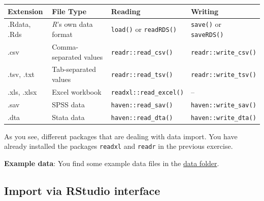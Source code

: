 \documentclass[
]{scrartcl}
\begin{document}
\begin{longtable}[]{@{}
  >{\raggedright\arraybackslash}p{}
  >{\raggedright\arraybackslash}p{}
  >{\raggedright\arraybackslash}p{}
  >{\raggedright\arraybackslash}p{}@{}}
\toprule\noalign{}
\begin{minipage}[b]{\linewidth}\raggedright
Extension
\end{minipage} & \begin{minipage}[b]{\linewidth}\raggedright
File Type
\end{minipage} & \begin{minipage}[b]{\linewidth}\raggedright
Reading
\end{minipage} & \begin{minipage}[b]{\linewidth}\raggedright
Writing
\end{minipage} \\
\midrule\noalign{}
\endhead
\bottomrule\noalign{}
\endlastfoot
.Rdata, .Rds & \emph{R}'s own data format & \texttt{load()} or \texttt{readRDS()} & \texttt{save()} or \texttt{saveRDS()} \\
.csv & Comma-separated values & \texttt{readr::read\_csv()} & \texttt{readr::write\_csv()} \\
.tsv, .txt & Tab-separated values & \texttt{readr::read\_tsv()} & \texttt{readr::write\_tsv()} \\
.xls, .xlsx & Excel workbook & \texttt{readxl::read\_excel()} & -- \\
.sav & SPSS data & \texttt{haven::read\_sav()} & \texttt{haven::write\_sav()} \\
.dta & Stata data & \texttt{haven::read\_dta()} & \texttt{haven::write\_dta()} \\
\end{longtable}

As you see, different packages that are dealing with data import. You have already installed the packages \texttt{readxl} and \texttt{readr} in the previous exercise.

\textbf{Example data}: You find some example data files in the \href{./data}{data folder}.

\subsection{Import via RStudio interface}\label{import-via-rstudio-interface}
\end{document}
